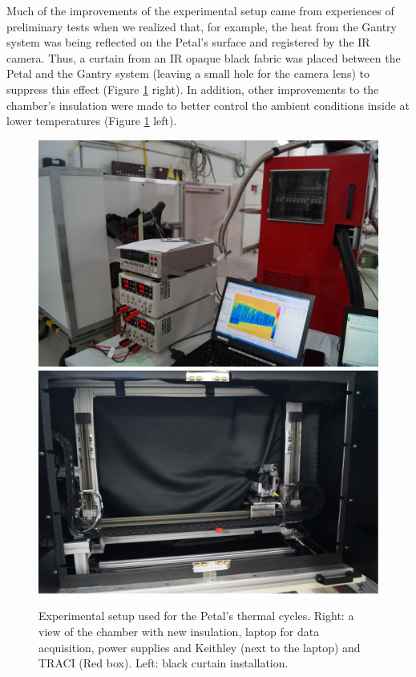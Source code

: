 		Much of the improvements of the experimental setup came from experiences of preliminary tests when we realized that, for example, the heat from the Gantry system was being reflected on the Petal’s surface and registered by the IR camera. Thus, a curtain from an IR opaque black fabric was placed between the Petal and the Gantry system (leaving a small hole for the camera lens) to suppress this effect (Figure \ref{fig2.7} right). In addition, other improvements to the chamber’s insulation were made to better control the ambient conditions inside at lower temperatures (Figure \ref{fig2.7} left). 
	
		\begin{figure}[ht!]
			\centering
			\captionsetup{justification=centering,margin=2cm}
			\includegraphics[scale=0.185]{Figures/Chapter02/ExperimentalSetup.jpg}
			\includegraphics[scale=0.22]{Figures/Chapter02/BlackCurtine.jpg}
			\caption{Experimental setup used for the Petal’s thermal cycles. Right: a view of the chamber with new insulation, laptop for data acquisition, power supplies and Keithley (next to the laptop) and TRACI (Red box). Left: black curtain installation.}\label{fig2.7}
		\end{figure}
	
